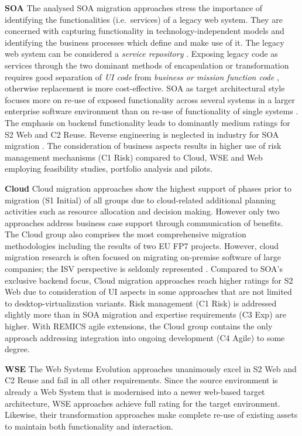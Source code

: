 \textbf{SOA} The analysed SOA migration approaches stress the importance of identifying the functionalities (i.e.~services) of a legacy web system.
They are concerned with capturing functionality in technology-independent models and identifying the business processes which define and make use of it.
The legacy web system can be considered a \emph{service repository} \autocite{Sosa2014MigraSOA}.
Exposing legacy code as services through the two dominant methods of encapsulation or transformation requires good separation of \emph{UI code} from \emph{business or mission function code} \autocite{Lewis2008SMART}, otherwise replacement is more cost-effective.
SOA as target architectural style focuses more on re-use of exposed functionality across several systems in a larger enterprise software environment than on re-use of functionality of single systems \autocite{Lewis2008SMART}.
The emphasis on backend functionality leads to dominantly medium ratings for S2 Web and C2 Reuse.
Reverse engineering is neglected in industry for SOA migration \autocite{Razavian2012}.
The consideration of business aspects results in higher use of risk management mechanisms (C1 Risk) compared to Cloud, WSE and Web employing feasibility studies, portfolio analysis and pilots.

\textbf{Cloud} Cloud migration approaches show the highest support of phases prior to migration (S1 Initial) of all groups due to cloud-related additional planning activities such as resource allocation and decision making.
However only two approaches address business case support through communication of benefits.
The Cloud group also comprises the most comprehensive migration methodologies including the results of two EU FP7 projects.
However, cloud migration research is often focused on migrating on-premise software of large companies; the ISV perspective is seldomly represented \autocite{Fowley2017CloudSME}.
Compared to SOA's exclusive backend focus, Cloud migration approaches reach higher ratings for S2 Web due to consideration of UI aspects in some approaches that are not limited to desktop-virtualization variants.
Risk management (C1 Risk) is addressed slightly more than in SOA migration and expertise requirements (C3 Exp) are higher.
With REMICS agile extensions, the Cloud group contains the only approach addressing integration into ongoing development (C4 Agile) to some degree.

\textbf{WSE} The Web Systems Evolution approaches unanimously excel in S2 Web and C2 Reuse and fail in all other requirements.
Since the source environment is already a Web System that is modernised into a newer web-based target architecture, WSE approaches achieve full rating for the target environment.
Likewise, their transformation approaches make complete re-use of existing assets to maintain both functionality and interaction.

